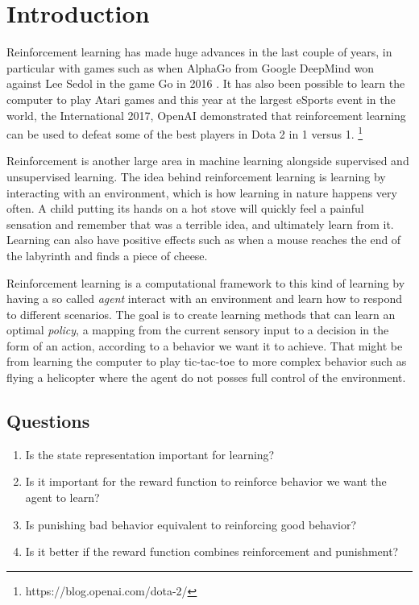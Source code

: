 \documentclass[report.tex]{subfiles}
\begin{document}
    \section*{\centering Introduction}

    Reinforcement learning has made huge advances in the last couple of years, in particular with games such as when AlphaGo from Google DeepMind won against Lee Sedol in the game Go in 2016 \cite{silver2016mastering}. It has also been possible to learn the computer to play Atari games \cite{mnih2013playing} and this year at the largest eSports event in the world, the International 2017, OpenAI demonstrated that reinforcement learning can be used to defeat some of the best players in Dota 2 in 1 versus 1. \footnote{https://blog.openai.com/dota-2/}

    Reinforcement is another large area in machine learning alongside supervised and unsupervised learning. The idea behind reinforcement learning is learning by interacting with an environment, which is how learning in nature happens very often. A child putting its hands on a hot stove will quickly feel a painful sensation and remember that was a terrible idea, and ultimately learn from it. Learning can also have positive effects such as when a mouse reaches the end of the labyrinth and finds a piece of cheese.

    Reinforcement learning is a computational framework to this kind of learning by having a so called \textit{agent} interact with an environment and learn how to respond to different scenarios. The goal is to create learning methods that can learn an optimal \textit{policy}, a mapping from the current sensory input to a decision in the form of an action, according to a behavior we want it to achieve. That might be from learning the computer to play tic-tac-toe to more complex behavior such as flying a helicopter where the agent do not posses full control of the environment.

    \subsection*{Questions}

    \begin{enumerate}
        \item Is the state representation important for learning?
        \item Is it important for the reward function to reinforce behavior we want the agent to learn?
        \item Is punishing bad behavior equivalent to reinforcing good behavior?
        \item Is it better if the reward function combines reinforcement and punishment?
    \end{enumerate}
\end{document}
